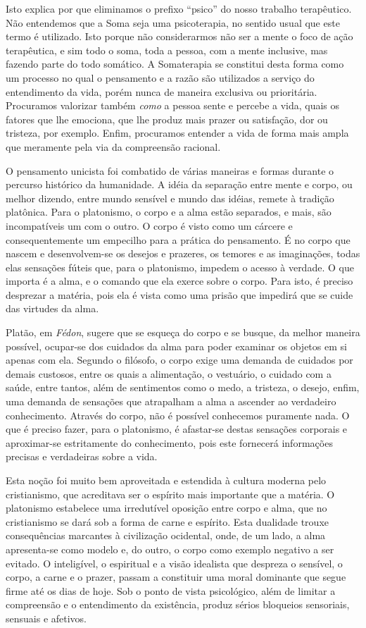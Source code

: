 Isto explica por que eliminamos o prefixo ``psico'' do nosso trabalho
terapêutico. Não entendemos que a Soma seja uma psicoterapia, no sentido
usual que este termo é utilizado. Isto porque não considerarmos não ser
a mente o foco de ação terapêutica, e sim todo o soma, toda a pessoa,
com a mente inclusive, mas fazendo parte do todo somático. A Somaterapia
se constitui desta forma como um processo no qual o pensamento e a razão
são utilizados a serviço do entendimento da vida, porém nunca de maneira
exclusiva ou prioritária. Procuramos valorizar também \emph{como} a
pessoa sente e percebe a vida, quais os fatores que lhe emociona, que
lhe produz mais prazer ou satisfação, dor ou tristeza, por exemplo.
Enfim, procuramos entender a vida de forma mais ampla que meramente pela
via da compreensão racional.

O pensamento unicista foi combatido de várias maneiras e formas durante
o percurso histórico da humanidade. A idéia da separação entre mente e
corpo, ou melhor dizendo, entre mundo sensível e mundo das idéias,
remete à tradição platônica. Para o platonismo, o corpo e a alma estão
separados, e mais, são incompatíveis um com o outro. O corpo é visto
como um cárcere e consequentemente um empecilho para a prática do
pensamento. É no corpo que nascem e desenvolvem-se os desejos e
prazeres, os temores e as imaginações, todas elas sensações fúteis que,
para o platonismo, impedem o acesso à verdade. O que importa é a alma, e
o comando que ela exerce sobre o corpo. Para isto, é preciso desprezar a
matéria, pois ela é vista como uma prisão que impedirá que se cuide das
virtudes da alma.

Platão, em \emph{Fédon}, sugere que se esqueça do corpo e se busque, da
melhor maneira possível, ocupar-se dos cuidados da alma para poder
examinar os objetos em si apenas com ela. Segundo o filósofo, o corpo
exige uma demanda de cuidados por demais custosos, entre os quais a
alimentação, o vestuário, o cuidado com a saúde, entre tantos, além de
sentimentos como o medo, a tristeza, o desejo, enfim, uma demanda de
sensações que atrapalham a alma a ascender ao verdadeiro conhecimento.
Através do corpo, não é possível conhecemos puramente nada. O que é
preciso fazer, para o platonismo, é afastar-se destas sensações
corporais e aproximar-se estritamente do conhecimento, pois este
fornecerá informações precisas e verdadeiras sobre a vida.

Esta noção foi muito bem aproveitada e estendida à cultura moderna pelo
cristianismo, que acreditava ser o espírito mais importante que a
matéria. O platonismo estabelece uma irredutível oposição entre corpo e
alma, que no cristianismo se dará sob a forma de carne e espírito. Esta
dualidade trouxe consequências marcantes à civilização ocidental, onde,
de um lado, a alma apresenta-se como modelo e, do outro, o corpo como
exemplo negativo a ser evitado. O inteligível, o espiritual e a visão
idealista que despreza o sensível, o corpo, a carne e o prazer, passam a
constituir uma moral dominante que segue firme até os dias de hoje. Sob
o ponto de vista psicológico, além de limitar a compreensão e o
entendimento da existência, produz sérios bloqueios sensoriais, sensuais
e afetivos.

